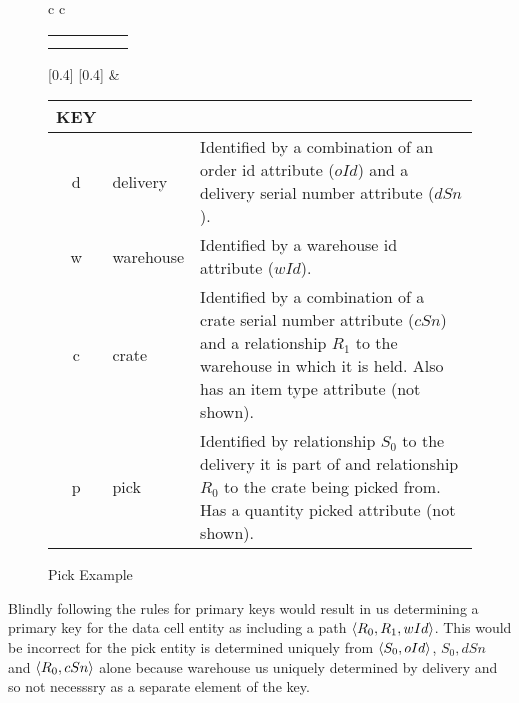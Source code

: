 \documentclass[10pt,a4paper]{article}
\begin{document}
\begin{figure} [H]
\begin{center}
\begin{tabular}{c c}
\begin{tabular}{cp{0.75cm}cp{0.75cm}c}
   \Rnode{d}{d}    & & \Rnode{w}{w}   & & \Rnode{v}{v}\\[1.2cm]     
	 \Rnode{p}{p}  & & \Rnode{c}{c} & &               
\end{tabular}
[0.4]
\idcomp
{}
[0.4]
\idcomp
{} 
\idcomp
{} 
\idcomp
{}
\idcomp
{}
\idcomp
{}
\idcomp
& \footnotesize
\begin{tabular}{c p{1.5cm} p{4cm}}
KEY && \\
\hline
d & delivery & Identified by a combination of an order id attribute ($oId$) and a
delivery serial number  attribute ($dSn$). \\
w & warehouse & Identified by a warehouse id attribute ($wId$). \\
c & crate & Identified by a combination of a crate serial number attribute ($cSn$) and a relationship $R_1$ to the warehouse in which it is held.
             Also has an item type attribute (not shown).\\
p & pick & Identified by relationship $S_0$ to the delivery  it is part of and relationship $R_0$ to the crate being picked from. Has a quantity picked attribute (not shown). \\
\end{tabular} 
\end{tabular}
\end{center}
\caption{Pick Example}
\label{pickexample}
\end{figure}

Blindly following the rules for primary keys would result in us determining
a primary key for the data cell entity as including a path 
$\langle R_0,R_1,wId\rangle$. This would be incorrect for the pick entity 
is determined uniquely from 
$\langle S_0,oId\rangle$, $S_0,dSn$ and $\langle R_0,cSn\rangle$ alone because 
warehouse us uniquely determined by delivery and so not necesssry as a separate 
element of the key. 
\end{document}
